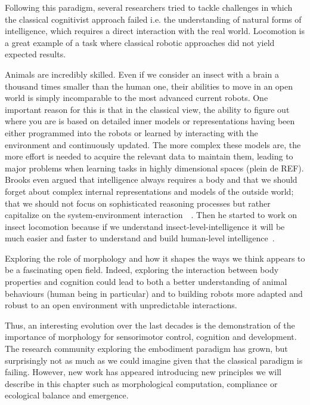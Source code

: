 Following this paradigm, several researchers tried to tackle challenges in which the classical cognitivist approach failed i.e. the understanding of natural forms of intelligence, which requires a direct interaction with the real world. Locomotion is a great example of a task where classical robotic approaches did not yield expected results.

Animals are incredibly skilled. Even if we consider an insect with a brain a thousand times smaller than the human one, their abilities to move in an open world is simply incomparable to the most advanced current robots. One important reason for this is that in the classical view, the ability to figure out where you are is based on detailed inner models or representations having been either programmed into the robots or learned by interacting with the environment and continuously updated. The more complex these models are, the more effort is needed to acquire the relevant data to maintain them, leading to major problems when learning tasks in highly dimensional spaces (plein de REF). Brooks even argued that intelligence always requires a body and that we should forget about complex internal representations and models of the outside world; that we should not focus on sophisticated reasoning processes but rather capitalize on the system-environment interaction~\parencite{brooks1991intelligence}~\parencite{brooks1995intelligence}. Then he started to work on insect locomotion because if we understand insect-level-intelligence it will be much easier and faster to understand and build human-level intelligence~\parencite{brooks1996prospects}.


Exploring the role of morphology and how it shapes the ways we think appears to be a fascinating open field. Indeed, exploring the interaction between body properties and cognition could lead to both a better understanding of animal behaviours (human being in particular) and to building robots more adapted and robust to an open environment with unpredictable interactions.

Thus, an interesting evolution over the last decades is the demonstration of the importance of morphology for sensorimotor control, cognition and development. The research community exploring the embodiment paradigm has grown, but surprisingly not as much as we could imagine given that the classical paradigm is failing. However, new work has appeared introducing new principles we will describe in this chapter such as morphological computation, compliance or ecological balance and emergence.

